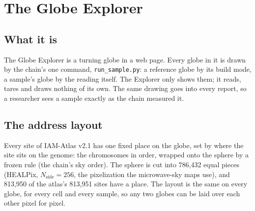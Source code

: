 
\chapter{The Globe Explorer}\label{ch:explorer}

\section{What it is}

The Globe Explorer is a turning globe in a web page. Every globe in it is drawn by the chain's one command,
\texttt{run\_sample.py}: a reference globe by its build mode, a sample's globe by the reading itself. The Explorer only shows them;
it reads, tares and draws nothing of its own. The same drawing goes into every report, so a researcher sees a sample exactly as the
chain measured it.

\section{The address layout}

Every site of IAM-Atlas v2.1 has one fixed place on the globe, set by where the site sits on the genome: the chromosomes in order,
wrapped onto the sphere by a frozen rule (the chain's sky order). The sphere is cut into 786{,}432 equal pieces (HEALPix,
$N_\mathrm{side}=256$, the pixelization the microwave-sky maps use), and 813{,}950 of the atlas's 813{,}951 sites have a place. The
layout is the same on every globe, for every cell and every sample, so any two globes can be laid over each other pixel for pixel.

